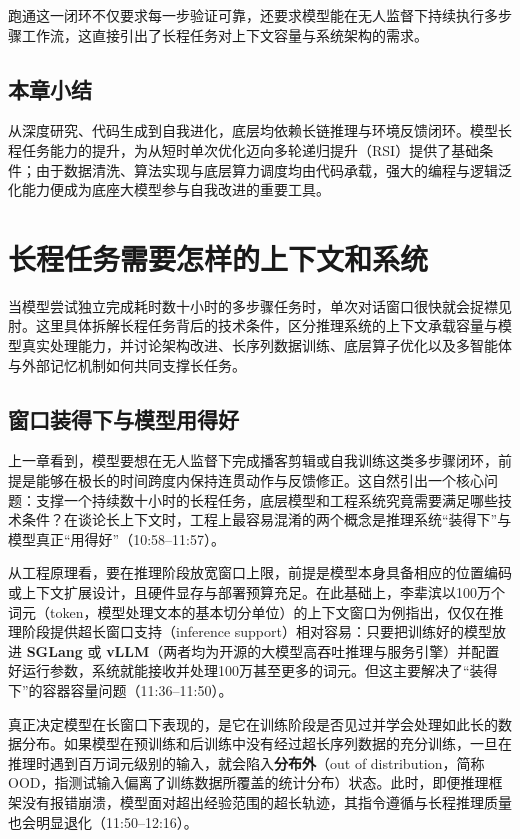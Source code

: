 \documentclass[UTF8,a4paper,11pt,fontset=fandol]{ctexart}
\begin{document}
跑通这一闭环不仅要求每一步验证可靠，还要求模型能在无人监督下持续执行多步骤工作流，这直接引出了长程任务对上下文容量与系统架构的需求。
\subsection{本章小结}
从深度研究、代码生成到自我进化，底层均依赖长链推理与环境反馈闭环。模型长程任务能力的提升，为从短时单次优化迈向多轮递归提升（RSI）提供了基础条件；由于数据清洗、算法实现与底层算力调度均由代码承载，强大的编程与逻辑泛化能力便成为底座大模型参与自我改进的重要工具。
\section{长程任务需要怎样的上下文和系统}
当模型尝试独立完成耗时数十小时的多步骤任务时，单次对话窗口很快就会捉襟见肘。这里具体拆解长程任务背后的技术条件，区分推理系统的上下文承载容量与模型真实处理能力，并讨论架构改进、长序列数据训练、底层算子优化以及多智能体与外部记忆机制如何共同支撑长任务。
\subsection{窗口装得下与模型用得好}
上一章看到，模型要想在无人监督下完成播客剪辑或自我训练这类多步骤闭环，前提是能够在极长的时间跨度内保持连贯动作与反馈修正。这自然引出一个核心问题：支撑一个持续数十小时的长程任务，底层模型和工程系统究竟需要满足哪些技术条件？在谈论长上下文时，工程上最容易混淆的两个概念是推理系统“装得下”与模型真正“用得好”（10:58–11:57）。

从工程原理看，要在推理阶段放宽窗口上限，前提是模型本身具备相应的位置编码或上下文扩展设计，且硬件显存与部署预算充足。在此基础上，李辈滨以100万个词元（token，模型处理文本的基本切分单位）的上下文窗口为例指出，仅仅在推理阶段提供超长窗口支持（inference support）相对容易：只要把训练好的模型放进 \textbf{SGLang} 或 \textbf{vLLM}（两者均为开源的大模型高吞吐推理与服务引擎）并配置好运行参数，系统就能接收并处理100万甚至更多的词元。但这主要解决了“装得下”的容器容量问题（11:36–11:50）。

真正决定模型在长窗口下表现的，是它在训练阶段是否见过并学会处理如此长的数据分布。如果模型在预训练和后训练中没有经过超长序列数据的充分训练，一旦在推理时遇到百万词元级别的输入，就会陷入\textbf{分布外}（out of distribution，简称 OOD，指测试输入偏离了训练数据所覆盖的统计分布）状态。此时，即便推理框架没有报错崩溃，模型面对超出经验范围的超长轨迹，其指令遵循与长程推理质量也会明显退化（11:50–12:16）。
\end{document}
